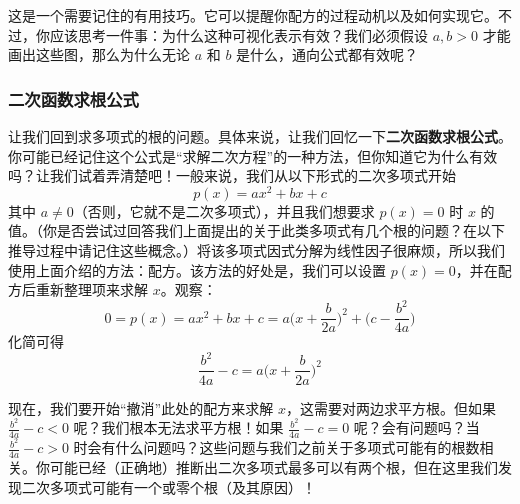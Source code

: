 这是一个需要记住的有用技巧。它可以提醒你配方的过程动机以及如何实现它。不过，你应该思考一件事：为什么这种可视化表示有效？我们必须假设 $a, b > 0$ 才能画出这些图，那么为什么无论 $a$ 和 $b$ 是什么，通向公式都有效呢？

\subsubsection*{二次函数求根公式}

让我们回到求多项式的根的问题。具体来说，让我们回忆一下\textbf{二次函数求根公式}。你可能已经记住这个公式是“求解二次方程”的一种方法，但你知道它为什么有效吗？让我们试着弄清楚吧！一般来说，我们从以下形式的二次多项式开始
\[p(x) = ax^2 + bx + c\]
其中 $a \ne 0$（否则，它就不是二次多项式），并且我们想要求 $p(x) = 0$ 时 $x$ 的值。（你是否尝试过回答我们上面提出的关于此类多项式有几个根的问题？在以下推导过程中请记住这些概念。）将该多项式因式分解为线性因子很麻烦，所以我们使用上面介绍的方法：配方。该方法的好处是，我们可以设置 $p(x)=0$，并在配方后重新整理项来求解 $x$。观察：
\[0 = p(x) = ax^2 + bx + c =a\Big(x+\frac{b}{2a}\Big)^2+\Big(c- \frac{b^2}{4a}\Big)\]
化简可得
\[\frac{b^2}{4a} -c = a\Big(x+\frac{b}{2a}\Big)^2\]

现在，我们要开始“撤消”此处的配方来求解 $x$，这需要对两边求平方根。但如果 $\frac{b^2}{4a} -c < 0$ 呢？我们根本无法求平方根！如果 $\frac{b^2}{4a} -c = 0$ 呢？会有问题吗？当 $\frac{b^2}{4a} -c > 0$ 时会有什么问题吗？这些问题与我们之前关于多项式可能有的根数相关。你可能已经（正确地）推断出二次多项式最多可以有两个根，但在这里我们发现二次多项式可能有一个或零个根（及其原因）！

